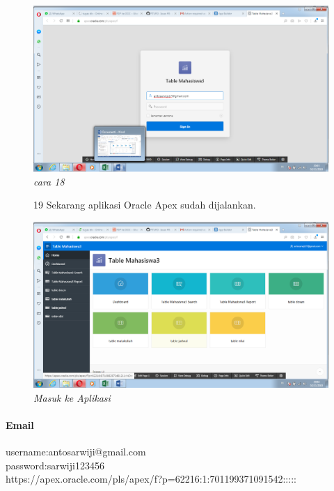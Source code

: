 \begin{enumerate}
\begin{figure}
      \begin{center}
\includegraphics[scale=0.2]{apex/db12.png}
    \caption{\textit{cara 18}}
        \end{center}
\label{gambar}
\end{figure}

\begin{figure}
\item[19]Sekarang aplikasi Oracle Apex sudah dijalankan.

    \begin{center}
\includegraphics[scale=0.2]{apex/db13.png}
    \caption{\textit{Masuk ke Aplikasi}}
        \end{center}
\label{gambar}
\end{figure}
\newpage
\paragraph{Email}
username:antosarwiji@gmail.com\\
password:sarwiji123456\\
https://apex.oracle.com/pls/apex/f?p=62216:1:701199371091542:::::\\

\end{enumerate}
